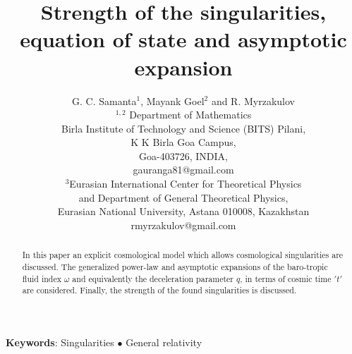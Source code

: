 \documentclass[11pt]{article}
\theoremstyle{theorem}
\theoremstyle{defi}
\begin{document}
\date{}

\title{\bf Strength of the singularities, equation of state and asymptotic expansion}
\author{G. C. Samanta$^{1}$, Mayank Goel$^{2}$ and R. Myrzakulov\\
$^{1, 2}$ Department of Mathematics\\
Birla Institute of Technology and Science (BITS) Pilani,\\
K K Birla Goa Campus,\\
Goa-403726, INDIA,\\ gauranga81@gmail.com\\
$^{3}$Eurasian International Center for Theoretical Physics\\ and Department of General Theoretical Physics,\\ Eurasian National University, Astana 010008, Kazakhstan\\
rmyrzakulov@gmail.com
}

\maketitle

\begin{abstract}In this paper an explicit cosmological model which allows cosmological singularities are discussed. The generalized power-law and asymptotic expansions of the baro-tropic fluid index $\omega$ and equivalently the deceleration parameter $q$, in terms of cosmic time $'t'$ are considered. Finally, the strength of the found
singularities is discussed.
\end{abstract}


\textbf{Keywords}: Singularities $\bullet$ General relativity
\end{document}
